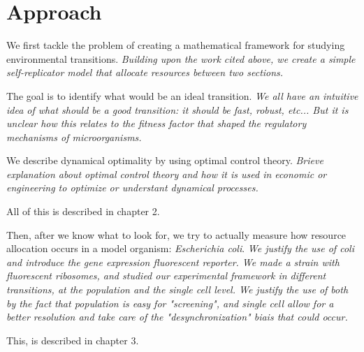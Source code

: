 \section{Approach}
\label{sec:approach}

We first tackle the problem of creating a mathematical framework for studying environmental transitions.
\textit{Building upon the work cited above, we create a simple self-replicator model that allocate resources between two sections.}

The goal is to identify what would be an ideal transition.
\textit{We all have an intuitive idea of what should be a good transition: it should be fast, robust, etc... But it is unclear how this relates to the fitness factor that shaped the regulatory mechanisms of microorganisms.}

We describe dynamical optimality by using optimal control theory.
\textit{Brieve explanation about optimal control theory and how it is used in economic or engineering to optimize or understant dynamical processes.}

All of this is described in chapter 2.

Then, after we know what to look for, we try to actually measure how resource allocation occurs in a model organism: \textit{Escherichia coli}.
\textit{We justify the use of coli and introduce the gene expression fluorescent reporter.
We made a strain with fluorescent ribosomes, and studied our experimental framework in different transitions, at the population and the single cell level.
We justify the use of both by the fact that population is easy for "screening", and single cell allow for a better resolution and take care of the "desynchronization" biais that could occur.}

This, is described in chapter 3.
